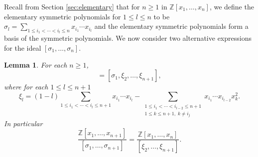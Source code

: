\documentclass{article}
\theoremstyle{plain}
\newtheorem{lem}[thm]{Lemma}
\theoremstyle{definition}
\numberwithin{thm}{section}
\begin{document}
			Recall from Section \ref{sec:elementary} that for $n\geq 1$ in $\mathbb{Z}[x_1,\dots,x_n]$,
			we define the elementary symmetric polynomials for $1\leq l\leq n$
			to be $\sigma_l=\sum_{1\leq i_1<\cdots<i_l\leq n}{x_{i_1}\cdots x_{i_l}}$
			and the elementary symmetric polynomials form a basis of the symmetric polynomials.
			We now consider two alternative expressions for the ideal $[\sigma_1,\dots,\sigma_n]$.
			
			\begin{lem}\label{lem:n+1elim}
				For each $n\geq 1$,
				\begin{equation*}
					[\sigma_1,\dots,\sigma_{n+1}]=[\sigma_1,\xi_2,\dots,\xi_{n+1}],
				\end{equation*}
				where for each $1\leq l\leq {n+1}$
				\begin{equation*}
					\xi_l =
					(1-l)\sum_{1\leq i_1<\cdots<i_l\leq n+1}{x_{i_1}\cdots x_{i_l}} -
					\sum_{\substack{1\leq i_1<\cdots<i_{l-2}\leq n+1\\
					1 \leq k \leq n+1,\; k \neq i_j}}
					{x_{i_1}\cdots x_{i_{l-2}}x_k^2}.
				\end{equation*}
				In particular
				\begin{equation*}
					\frac{\mathbb{Z}[x_1,\dots,x_{n+1}]}{[\sigma_1,\dots,\sigma_{n+1}]}=\frac{\mathbb{Z}[x_1,\dots,x_n]}{[\xi_2,\dots,\xi_{n+1}]}.
				\end{equation*}
			\end{lem}
\end{document}
